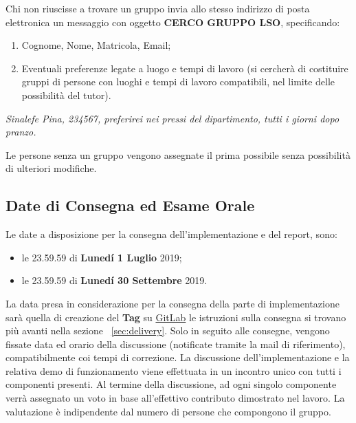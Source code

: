 Chi non riuscisse a trovare un gruppo invia allo stesso indirizzo di posta
elettronica un messaggio con oggetto \textbf{CERCO GRUPPO LSO}, specificando:

\begin{enumerate}

 \item Cognome, Nome, Matricola, Email;

 \item Eventuali preferenze legate a luogo e tempi di lavoro (si cercherà di
       costituire gruppi di persone con luoghi e tempi di lavoro compatibili, nel
       limite delle possibilità del tutor).

\end{enumerate}

\begin{tcolorbox}[colback=green!20!white,colframe=green!75!black,title=Email di esempio con oggetto \textbf{CERCO GRUPPO LSO}]
 \textit{Sinalefe Pina, 234567, preferirei nei pressi del dipartimento, tutti i giorni dopo pranzo.}
\end{tcolorbox}

Le persone senza un gruppo vengono assegnate il prima possibile senza
possibilità di ulteriori modifiche.

\subsection{Date di Consegna ed Esame Orale}

Le date a disposizione per la consegna dell'implementazione e del report, sono:

\begin{itemize}
 \item le 23.59.59 di \textbf{Lunedí 1 Luglio} 2019;
 \item le 23.59.59 di \textbf{Lunedí 30 Settembre} 2019.
\end{itemize}

La data presa in considerazione per la consegna della parte di implementazione
sarà quella di creazione del \textbf{Tag} su \href{https://gitlab.com}{GitLab}
le istruzioni sulla consegna si trovano più avanti nella sezione
~\ref{sec:delivery}. Solo in seguito alle consegne, vengono fissate data ed
orario della discussione (notificate tramite la mail di riferimento),
compatibilmente coi tempi di correzione. La discussione dell'implementazione e
la relativa demo di funzionamento viene effettuata in un incontro unico con
tutti i componenti presenti. Al termine della discussione, ad ogni singolo
componente verrà assegnato un voto in base all'effettivo contributo dimostrato
nel lavoro. La valutazione è indipendente dal numero di persone che compongono
il gruppo.
